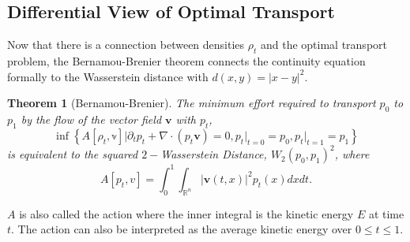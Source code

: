\documentclass[12pt]{article}
\theoremstyle{plain}
\newtheorem{thm}{Theorem}[section]
\numberwithin{equation}{section}
\begin{document}
\subsection{Differential View of Optimal Transport}
Now that there is a connection between densities $\rho_t$ and the optimal transport problem, the Bernamou-Brenier theorem connects the continuity equation formally to the Wasserstein distance with $d(x,y) = |x-y|^2$.
\begin{thm}[Bernamou-Brenier]\label{thm:bernamou}
	The minimum effort required to transport $p_0$ to $p_1$ by the flow of the vector field $\mathbf{v}$ with $p_t$,
	\begin{equation}
		\inf\left\{A[\rho_t,\mathbb{v}]\bigg\vert\partial_t p_t + \nabla \cdot (p_t \mathbf{v}) = 0,p_t\vert_{t=0}=p_0, p_t\vert_{t=1}=p_1\right\}
	\end{equation} 
	is equivalent to the squared $2-$Wasserstein Distance, $W_2(p_0,p_1)^2$, where \[A[p_t,v] = \int_0^1\int_{\mathbb{R}^n} |\mathbf{v}(t,x)|^2p_t(x)dxdt.\]
\end{thm}
$A$ is also called the action where the inner integral is the kinetic energy $E$ at time $t$. The action can also be interpreted as the average kinetic energy over $0\le t \le 1$. 
\end{document}
